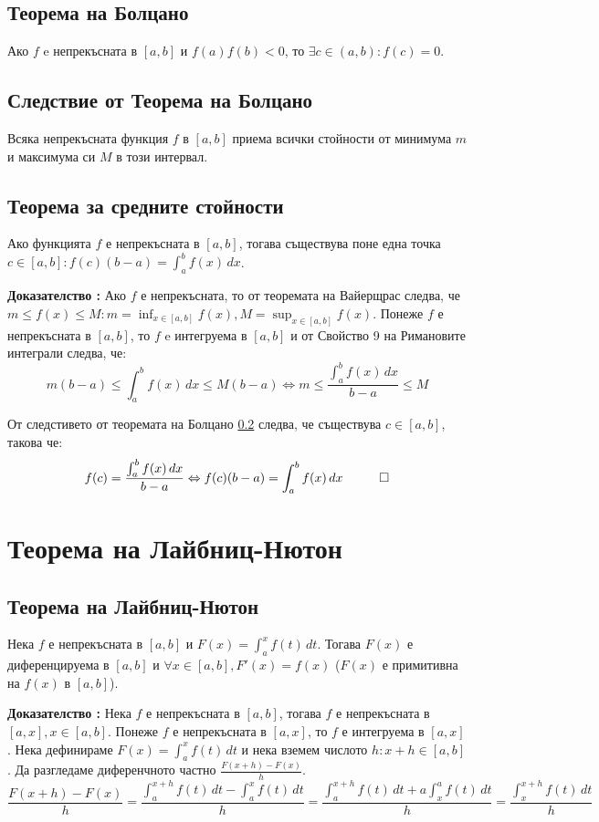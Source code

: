 \documentclass[fleqn,12pt]{article}
\begin{document}
\subsection{Теорема на Болцано}
Ако $f$ e непрекъсната в $[a,b]$ и $f(a)f(b)<0$, то $\exists c \in (a,b): f(c) = 0$.

\subsection{Следствие от Теорема на Болцано} \label{boltzano:extra}
Всяка непрекъсната функция $f$ в $[a,b]$ приема всички стойности от минимума $m$ и максимума си $M$ в този интервал.

\subsection{Теорема за средните стойности}
Ако функцията $f$ е непрекъсната в $[a,b]$, тогава съществува поне една точка $c \in [a,b]: f(c)(b-a) = \int_{a}^{b}  f(x)\,dx$.

\textbf{Доказателство :} Ако $f$ е непрекъсната, то от теоремата на Вайерщрас следва, че $m \leq f(x) \leq M: m = \inf_{x \in [a,b]}f(x), M = \sup_{x \in [a,b]}f(x)$.
Понеже $f$ е непрекъсната в $[a,b]$, то $f$ e интегруема в $[a,b]$ и от Свойство 9 на Римановите интеграли следва, че:
\[ m(b-a) \leq \int_{a}^{b}  f(x)\,dx \leq M(b-a) \Leftrightarrow m \leq \frac{\int_{a}^{b} f(x)\,dx}{b-a} \leq M \] 

От следстивето от теоремата на Болцано \ref{boltzano:extra} следва, че съществува $c \in [a,b]$, такова че: 
\[ f(c) = \frac{\int_{a}^{b} f(x)\,dx}{b-a} \Leftrightarrow f(c)(b-a) = \int_{a}^{b}  f(x)\,dx \hspace{10mm} \square \]

\section{Теорема на Лайбниц-Нютон}
\subsection{Теорема на Лайбниц-Нютон}
Нека $f$ е непрекъсната в $[a,b]$ и $F(x)=\int_{a}^{x} f(t)\,dt$. Тогава $F(x)$ е диференцируема в $[a,b]$ и $\forall x \in [a,b], F'(x)=f(x)$ ($F(x)$ е примитивна на $f(x)$ в $[a,b]$).

\textbf{Доказателство :} Нека $f$ е непрекъсната в $[a,b]$, тогава $f$ е непрекъсната в $[a,x], x \in [a,b]$. Понеже  $f$ е непрекъсната в $[a,x]$, то $f$ е интегруема в $[a,x]$.
Нека дефинираме $F(x)=\int_{a}^{x} f(t)\,dt$ и нека вземем числото $h: x+h\in[a,b]$. Да разгледаме диференчното частно $\frac{F(x+h)-F(x)}{h}$.
\[\frac{F(x+h)-F(x)}{h} = \frac{\int_{a}^{x+h} f(t)\,dt - \int_{a}^{x} f(t)\,dt}{h} = \frac{\int_{a}^{x+h} f(t)\,dt + a\int_{x}^{a} f(t)\,dt}{h} = \frac{\int_{x}^{x+h} f(t)\,dt}{h} \]
\end{document}
